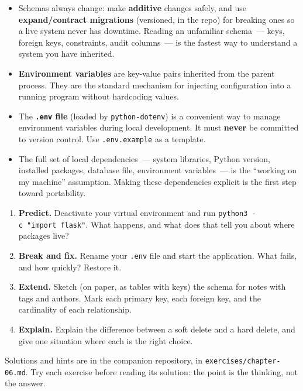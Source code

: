 \begin{takeaways}
\begin{itemize}
\item
  Schemas always change: make \textbf{additive} changes safely, and use \textbf{expand/contract migrations} (versioned, in the repo) for breaking ones so a live system never has downtime. Reading an unfamiliar schema~--- keys, foreign keys, constraints, audit columns~--- is the fastest way to understand a system you have inherited.
\item
  \textbf{Environment variables} are key-value pairs inherited from the parent process. They are the standard mechanism for injecting configuration into a running program without hardcoding values.
\item
  The \textbf{\texttt{.env} file} (loaded by \texttt{python-dotenv}) is a convenient way to manage environment variables during local development. It must \textbf{never} be committed to version control. Use \texttt{.env.example} as a template.
\item
  The full set of local dependencies~--- system libraries, Python version, installed packages, database file, environment variables~--- is the ``working on my machine'' assumption. Making these dependencies explicit is the first step toward portability.
\end{itemize}

\end{takeaways}

\label{06-local-dependencies:exercises}

\begin{enumerate}
\def\labelenumi{\arabic{enumi}.}
\tightlist
\item
  \textbf{Predict.} Deactivate your virtual environment and run \texttt{python3\ -}\allowbreak{}\texttt{c\ "import\ flask"}. What happens, and what does that tell you about where packages live?
\item
  \textbf{Break and fix.} Rename your \texttt{.env} file and start the application. What fails, and how quickly? Restore it.
\item
  \textbf{Extend.} Sketch (on paper, as tables with keys) the schema for notes with tags and authors. Mark each primary key, each foreign key, and the cardinality of each relationship.
\item
  \textbf{Explain.} Explain the difference between a soft delete and a hard delete, and give one situation where each is the right choice.
\end{enumerate}

\noindent{}Solutions and hints are in the companion repository, in \texttt{exercises/}\allowbreak{}\texttt{chapter-06.md}. Try each exercise before reading its solution: the point is the thinking, not the answer.

